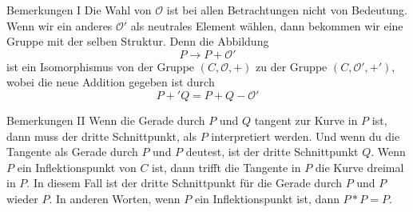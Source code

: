 \documentclass{beamer}
\begin{document}
\begin{frame}{Bemerkungen I}
    Die Wahl von \(\mathcal{O}\) ist bei allen Betrachtungen nicht von Bedeutung. Wenn wir ein anderes \(\mathcal{O}'\) als neutrales Element wählen, dann bekommen wir eine Gruppe mit der selben Struktur. Denn die Abbildung
    \[P\rightarrow P+\mathcal{O}'\]
    ist ein Isomorphismus von der Gruppe \((C,\mathcal{O},+)\) zu der Gruppe \((C,\mathcal{O}',+')\), wobei die neue Addition gegeben ist durch
    \[P+'Q=P+Q-\mathcal{O}'\]
\end{frame}

\begin{frame}{Bemerkungen II}
    Wenn die Gerade durch \(P\) und \(Q\) tangent zur Kurve in \(P\) ist, dann muss der dritte Schnittpunkt, als \(P\) interpretiert werden. Und wenn du die Tangente als Gerade durch \(P\) und \(P\) deutest, ist der dritte Schnittpunkt \(Q\). Wenn \(P\) ein Inflektionspunkt von \(C\)
    ist, dann trifft die Tangente in \(P\) die Kurve dreimal in \(P\). In diesem Fall ist der dritte Schnittpunkt für die Gerade durch \(P\) und \(P\) wieder \(P\). In anderen Worten, wenn \(P\) ein Inflektionspunkt ist, dann \(P\ast P=P\).
\end{frame}
\end{document}
